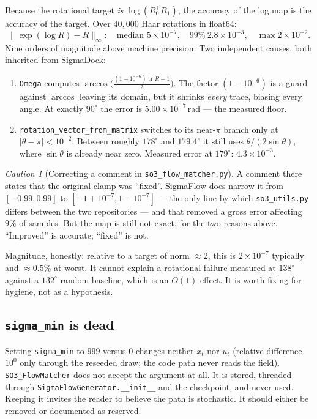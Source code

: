 \documentclass[11pt,a4paper]{report}
\theoremstyle{definition}
\theoremstyle{remark}
\newtheorem{caution}[caution]{Caution}
\newcommand{\file}[1]{\texttt{#1}}
\newcommand{\pyfunc}[1]{\texttt{#1}}
\begin{document}
Because the rotational target \emph{is} $\log(R_0^{\mathsf T}R_1)$, the
accuracy of the log map is the accuracy of the target. Over $40{,}000$ Haar
rotations in float64:
\[
\bigl\|\exp(\log R)-R\bigr\|_\infty:\quad
\text{median }5\times10^{-7},\quad
99\%\ 2.8\times10^{-3},\quad
\max 2\times10^{-2}.
\]
Nine orders of magnitude above machine precision. Two independent causes,
both inherited from SigmaDock:

\begin{enumerate}
\item \pyfunc{Omega} computes
      $\arccos\bigl(\tfrac{(1-10^{-6})\operatorname{tr}R-1}{2}\bigr)$. The
      factor $(1-10^{-6})$ is a guard against $\arccos$ leaving its domain,
      but it shrinks \emph{every} trace, biasing every angle. At exactly
      $90^\circ$ the error is $5.00\times10^{-7}$\,rad --- the measured floor.
\item \pyfunc{rotation\_vector\_from\_matrix} switches to its near-$\pi$
      branch only at $|\theta-\pi|<10^{-2}$. Between roughly $178^\circ$ and
      $179.4^\circ$ it still uses $\theta/(2\sin\theta)$, where $\sin\theta$
      is already near zero. Measured error at $179^\circ$: $4.3\times10^{-3}$.
\end{enumerate}

\begin{caution}[Correcting a comment in \file{so3\_flow\_matcher.py}]
\label{caution:omega-not-fixed}
A comment there states that the original clamp was ``fixed''. SigmaFlow does
narrow it from $[-0.99,0.99]$ to $[-1+10^{-7},1-10^{-7}]$ --- the only line by
which \file{so3\_utils.py} differs between the two repositories --- and that
removed a gross error affecting $9\%$ of samples. But the map is still not
exact, for the two reasons above. ``Improved'' is accurate; ``fixed'' is not.

Magnitude, honestly: relative to a target of norm $\approx2$, this is
$2\times10^{-7}$ typically and $\approx0.5\%$ at worst. It cannot explain a
rotational failure measured at $138^\circ$ against a $132^\circ$ random
baseline, which is an $O(1)$ effect. It is worth fixing for hygiene, not as a
hypothesis.
\end{caution}

\subsection{\texttt{sigma\_min} is dead}
Setting \texttt{sigma\_min} to $999$ versus $0$ changes neither $x_t$ nor
$u_t$ (relative difference $10^{0}$ only through the reseeded draw; the code
path never reads the field). \pyfunc{SO3\_FlowMatcher} does not accept the
argument at all. It is stored, threaded through
\pyfunc{SigmaFlowGenerator.\_\_init\_\_} and the checkpoint, and never used.
Keeping it invites the reader to believe the path is stochastic. It should
either be removed or documented as reserved.
\end{document}
